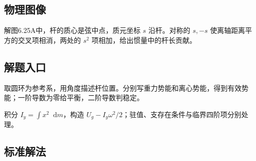 \documentclass[UTF8,fontset=fandol,a4paper,11pt]{ctexart}
\newcommand{\dd}{\mathop{}\!\mathrm{d}}
\begin{document}


\subsection*{物理图像}

解图6.25A中，杆的质心是弦中点，质元坐标 $s$ 沿杆。对称的 $s,-s$ 使离轴距离平方的交叉项相消，两处的 $s^2$ 项相加，给出惯量中的杆长贡献。



\subsection*{解题入口}

取圆环为参考系，用角度描述杆位置。分别写重力势能和离心势能，得到有效势能；一阶导数为零给平衡，二阶导数判稳定。

积分 $I_y=\int x^2\dd m$，构造 $U_g-I_y\omega^2/2$；驻值、支存在条件与临界四阶项分别处理。



\subsection*{标准解法}
\end{document}

